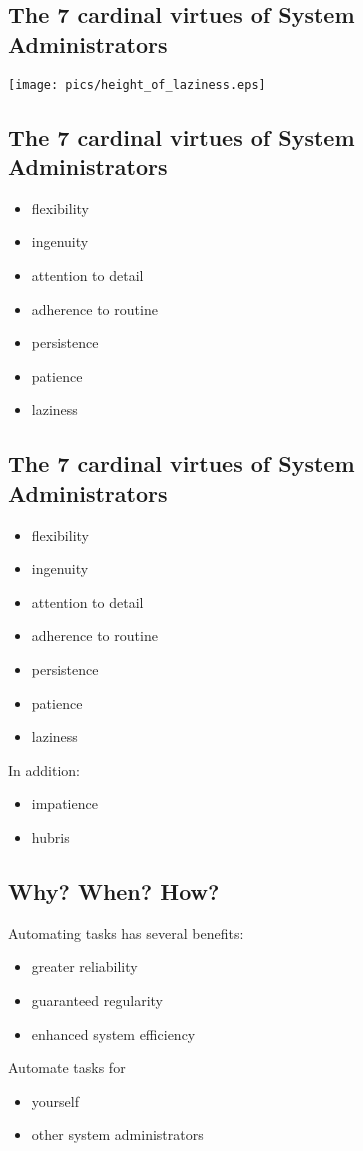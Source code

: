 \documentclass[xga]{xdvislides}
\begin{document}
\subsection{The 7 cardinal virtues of System Administrators}
\vspace*{\fill}
\begin{center}
	\texttt{[image: pics/height\_of\_laziness.eps]}
\end{center}
\vspace*{\fill}


\subsection{The 7 cardinal virtues of System Administrators}
\begin{itemize}
	\item flexibility
	\item ingenuity
	\item attention to detail
	\item adherence to routine
	\item persistence
	\item patience
	\item laziness
\end{itemize}

\subsection{The 7 cardinal virtues of System Administrators}
\begin{itemize}
	\item flexibility
	\item ingenuity
	\item attention to detail
	\item adherence to routine
	\item persistence
	\item patience
	\item laziness
\end{itemize}
\addvspace{.5in}

In addition:
\begin{itemize}
	\item impatience
	\item hubris
\end{itemize}

\subsection{Why?  When?  How?}
Automating tasks has several benefits:
\begin{itemize}
	\item greater reliability
	\item guaranteed regularity
	\item enhanced system efficiency
\end{itemize}
\vspace{.5in}
Automate tasks for
\begin{itemize}
	\item yourself
	\item other system administrators
\end{itemize}
\end{document}
